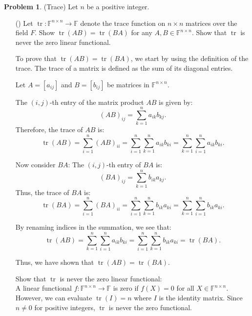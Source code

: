 \documentclass[12pt]{article}
\theoremstyle{definition}
\newtheorem{problem}{Problem}
\newcounter{subq}[problem]
\newenvironment{subproblem}
{\refstepcounter{subq} \begin{itemize} \item[(\alph{subq})]}
{\end{itemize} \medskip}
\DeclareMathOperator{\tr}{tr}
\begin{document}
\begin{problem}
    (Trace) Let $n$ be a positive integer.

    \begin{subproblem}
        Let $\tr: \mathbb{F}^{n \times n} \rightarrow \mathbb{F}$ denote the trace function on $n \times n$ matrices over the field $F$.
        Show $\tr(AB) = \tr(BA)$ for any $A, B \in \mathbb{F}^{n \times n}$. Show that $\tr$ is never the zero linear functional. 

        \begin{solution}
            To prove that \( \tr(AB) = \tr(BA) \), we start by using the definition of the trace. The trace of a matrix is defined as the sum of its diagonal entries. 

            Let \( A = [a_{ij}] \) and \( B = [b_{ij}] \) be matrices in \( \mathbb{F}^{n \times n} \).

            The \( (i,j) \)-th entry of the matrix product \( AB \) is given by:
            \[
            (AB)_{ij} = \sum_{k=1}^n a_{ik} b_{kj}.
            \]
            Therefore, the trace of \( AB \) is:
            \[
            \tr(AB) = \sum_{i=1}^n (AB)_{ii} = \sum_{i=1}^n \sum_{k=1}^n a_{ik} b_{ki} = \sum_{k=1}^n \sum_{i=1}^n a_{ik} b_{ki}.
            \]

            Now consider \( BA \):
            The \( (i,j) \)-th entry of \( BA \) is:
            \[
            (BA)_{ij} = \sum_{k=1}^n b_{ik} a_{kj}.
            \]
            Thus, the trace of \( BA \) is:
            \[
            \tr(BA) = \sum_{i=1}^n (BA)_{ii} = \sum_{i=1}^n \sum_{k=1}^n b_{ik} a_{ki} = \sum_{k=1}^n \sum_{i=1}^n b_{ik} a_{ki}.
            \]

            By renaming indices in the summation, we see that:
            \[
            \tr(AB) = \sum_{k=1}^n \sum_{i=1}^n a_{ik} b_{ki} = \sum_{i=1}^n \sum_{k=1}^n b_{ik} a_{ki} = \tr(BA).
            \]

            Thus, we have shown that \( \tr(AB) = \tr(BA) \).

            Show that \( \tr \) is never the zero linear functional:\\
            A linear functional \( f: \mathbb{F}^{n \times n} \rightarrow \mathbb{F} \) is zero if \( f(X) = 0 \) for all \( X \in \mathbb{F}^{n \times n} \). However, we can evaluate \( \tr(I) = n \) where \( I \) is the identity matrix. Since \( n \neq 0 \) for positive integers, \( \tr \) is never the zero functional.
        
        \end{solution}
    \end{subproblem}


\end{problem}
\end{document}

